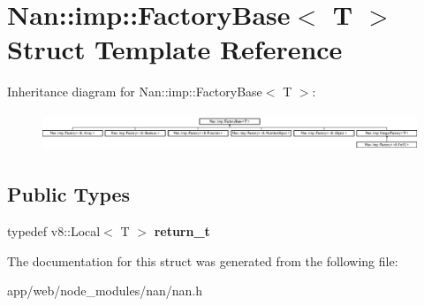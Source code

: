 \hypertarget{struct_nan_1_1imp_1_1_factory_base}{}\section{Nan\+:\+:imp\+:\+:Factory\+Base$<$ T $>$ Struct Template Reference}
\label{struct_nan_1_1imp_1_1_factory_base}
Inheritance diagram for Nan\+:\+:imp\+:\+:Factory\+Base$<$ T $>$\+:\begin{figure}[H]
\begin{center}
\leavevmode
\includegraphics[height=1.152263cm]{struct_nan_1_1imp_1_1_factory_base}
\end{center}
\end{figure}
\subsection*{Public Types}
\begin{DoxyCompactItemize}
\item 
\mbox{\label{struct_nan_1_1imp_1_1_factory_base_a2a0f174e2adde4b05b2fbfbcfdd00cc5}} 
typedef v8\+::\+Local$<$ T $>$ {\bfseries return\+\_\+t}
\end{DoxyCompactItemize}


The documentation for this struct was generated from the following file\+:\begin{DoxyCompactItemize}
\item 
app/web/node\+\_\+modules/nan/nan.\+h\end{DoxyCompactItemize}
